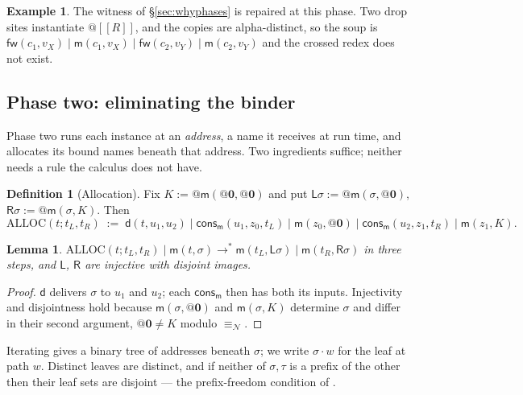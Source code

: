 \documentclass[11pt]{article}
\makeatletter
\theoremstyle{plain}
\newtheorem{lemma}[theorem]{Lemma}
\theoremstyle{definition}
\newtheorem{definition}[theorem]{Definition}
\newtheorem{example}[theorem]{Example}
\theoremstyle{remark}
\newcommand{\quo}[1]{@#1}
\newcommand{\nil}{\mathbf{0}}
\newcommand{\enc}[1]{[\![#1]\!]}
\newcommand{\nequiv}{\equiv_{\mathcal{N}}}
\newcommand{\mm}{\mathsf{m}}
\newcommand{\dd}{\mathsf{d}}
\newcommand{\fw}{\mathsf{fw}}
\newcommand{\cons}{\mathsf{cons}}
\newcommand{\Lft}{\mathsf{L}}
\newcommand{\Rgt}{\mathsf{R}}
\newcommand{\wred}{\longrightarrow^{*}}
\makeatother
\begin{document}
\begin{example}
\label{ex:phase1}
The witness of \S\ref{sec:whyphases} is repaired at this phase. Two drop
sites instantiate $\quo{\enc{R}}$, and the copies are alpha-distinct, so the
soup is $\fw(c_{1},v_{X}) \mid \mm(c_{1},v_{X}) \mid \fw(c_{2},v_{Y}) \mid
\mm(c_{2},v_{Y})$ and the crossed redex does not exist.
\end{example}

\subsection{Phase two: eliminating the binder}
\label{sec:phase2}

Phase two runs each instance at an \emph{address}, a name it receives at run
time, and allocates its bound names beneath that address. Two ingredients
suffice; neither needs a rule the calculus does not have.

\begin{definition}[Allocation]
\label{def:alloc}
Fix $K := \quo{\mm(\quo{\nil},\quo{\nil})}$ and put
$\Lft\sigma := \quo{\mm(\sigma,\quo{\nil})}$,
$\Rgt\sigma := \quo{\mm(\sigma,K)}$. Then
\[
  \mathrm{ALLOC}(t;t_{L},t_{R}) \;:=\;
  \dd(t,u_{1},u_{2}) \mid \cons_{\mm}(u_{1},z_{0},t_{L}) \mid \mm(z_{0},\quo{\nil})
  \mid \cons_{\mm}(u_{2},z_{1},t_{R}) \mid \mm(z_{1},K).
\]
\end{definition}

\begin{lemma}
\label{lem:alloc}
$\mathrm{ALLOC}(t;t_{L},t_{R}) \mid \mm(t,\sigma) \wred
\mm(t_{L},\Lft\sigma) \mid \mm(t_{R},\Rgt\sigma)$ in three steps, and
$\Lft$, $\Rgt$ are injective with disjoint images.
\end{lemma}

\begin{proof}
$\dd$ delivers $\sigma$ to $u_{1}$ and $u_{2}$; each $\cons_{\mm}$ then has
both its inputs. Injectivity and disjointness hold because
$\mm(\sigma,\quo{\nil})$ and $\mm(\sigma,K)$ determine $\sigma$ and differ in
their second argument, $\quo{\nil} \neq K$ modulo $\nequiv$.
\end{proof}

Iterating gives a binary tree of addresses beneath $\sigma$; we write
$\sigma\!\cdot\!w$ for the leaf at path $w$. Distinct leaves are distinct, and
if neither of $\sigma,\tau$ is a prefix of the other then their leaf sets are
disjoint --- the prefix-freedom condition of \cite{nowns}.
\end{document}
